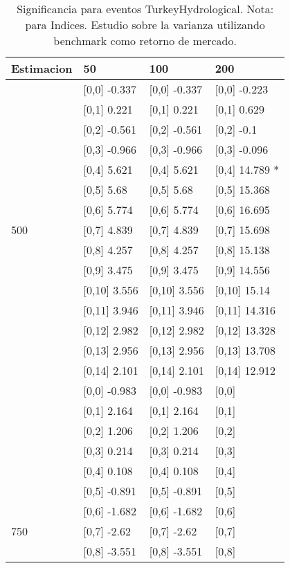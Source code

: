 \begin{table}

\caption{Significancia para eventos TurkeyHydrological. Nota: para Indices. Estudio sobre la varianza utilizando benchmark como retorno de mercado.}
\centering
\begin{tabular}[t]{llll}
\toprule
Estimacion & 50 & 100 & 200\\
\midrule
 & {}[0,0] -0.337 & {}[0,0] -0.337 & {}[0,0] -0.223\\
 & {}[0,1] 0.221 & {}[0,1] 0.221 & {}[0,1] 0.629\\
 & {}[0,2] -0.561 & {}[0,2] -0.561 & {}[0,2] -0.1\\
 & {}[0,3] -0.966 & {}[0,3] -0.966 & {}[0,3] -0.096\\
 & {}[0,4] 5.621 & {}[0,4] 5.621 & {}[0,4] 14.789 *\\
\addlinespace
 & {}[0,5] 5.68 & {}[0,5] 5.68 & {}[0,5] 15.368\\
 & {}[0,6] 5.774 & {}[0,6] 5.774 & {}[0,6] 16.695\\
500 & {}[0,7] 4.839 & {}[0,7] 4.839 & {}[0,7] 15.698\\
 & {}[0,8] 4.257 & {}[0,8] 4.257 & {}[0,8] 15.138\\
 & {}[0,9] 3.475 & {}[0,9] 3.475 & {}[0,9] 14.556\\
\addlinespace
 & {}[0,10] 3.556 & {}[0,10] 3.556 & {}[0,10] 15.14\\
 & {}[0,11] 3.946 & {}[0,11] 3.946 & {}[0,11] 14.316\\
 & {}[0,12] 2.982 & {}[0,12] 2.982 & {}[0,12] 13.328\\
 & {}[0,13] 2.956 & {}[0,13] 2.956 & {}[0,13] 13.708\\
 & {}[0,14] 2.101 & {}[0,14] 2.101 & {}[0,14] 12.912\\
\addlinespace
 & {}[0,0] -0.983 & {}[0,0] -0.983 & {}[0,0]\\
 & {}[0,1] 2.164 & {}[0,1] 2.164 & {}[0,1]\\
 & {}[0,2] 1.206 & {}[0,2] 1.206 & {}[0,2]\\
 & {}[0,3] 0.214 & {}[0,3] 0.214 & {}[0,3]\\
 & {}[0,4] 0.108 & {}[0,4] 0.108 & {}[0,4]\\
\addlinespace
 & {}[0,5] -0.891 & {}[0,5] -0.891 & {}[0,5]\\
 & {}[0,6] -1.682 & {}[0,6] -1.682 & {}[0,6]\\
750 & {}[0,7] -2.62 & {}[0,7] -2.62 & {}[0,7]\\
 & {}[0,8] -3.551 & {}[0,8] -3.551 & {}[0,8]\\

\end{tabular}
\end{table}
